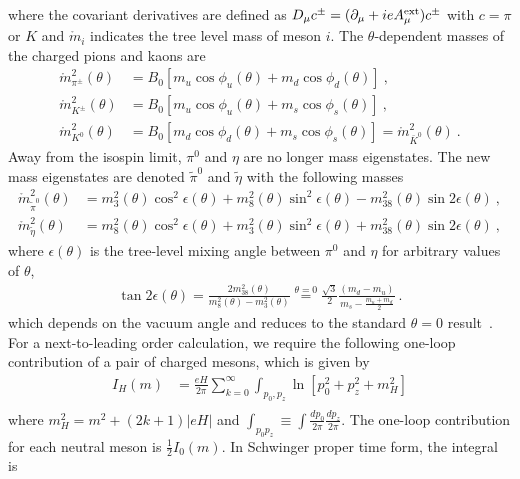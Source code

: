 \documentclass[12pt]{elsarticle}
\begin{document}
where the covariant derivatives are defined as $D_{\mu}c^{\pm}=(\partial_{\mu}+ieA^{\rm ext}_{\mu})c^{\pm}$ with $c=\pi$ or $K$ and $\mathring{m}_{i}$ indicates the tree level mass of meson $i$. The $\theta$-dependent masses of the charged pions and kaons are
\begin{align}
\label{eq:mp}
\mathring{m}_{\pi^{\pm}}^{2}(\theta)&=B_{0}[m_{u}\cos\phi_{u}(\theta)+m_{d}\cos\phi_{d}(\theta)]\ ,\\
\label{eq:mkc}
\mathring{m}_{K^{\pm}}^{2}(\theta)&=B_{0}[m_{u}\cos\phi_{u}(\theta)+m_{s}\cos\phi_{s}(\theta)]\ ,\\
\label{eq:mk0}
\mathring{m}_{K^{0}}^{2}(\theta)&=B_{0}[m_{d}\cos\phi_{d}(\theta)+m_{s}\cos\phi_{s}(\theta)]=\mathring{m}_{\bar{K}^{0}}^{2}(\theta)\ .
\end{align}
Away from the isospin limit, $\pi^{0}$ and $\eta$ are no longer mass eigenstates. The new mass eigenstates are denoted $\tilde{\pi}^{0}$ and $\tilde{\eta}$ with the following masses
\begin{align}
\label{eq:mp0t}
\mathring{m}_{\tilde{\pi}^{0}}^{2}(\theta)&=m_{3}^{2}(\theta)\cos^{2}\epsilon(\theta)+m_{8}^{2}(\theta)\sin^{2}\epsilon(\theta)-m_{38}^{2}(\theta)\sin2\epsilon(\theta)\ ,\\
\label{eq:metat}
\mathring{m}_{\tilde{\eta}}^{2}(\theta)&=m_{8}^{2}(\theta)\cos^{2}\epsilon(\theta)+m_{3}^{2}(\theta)\sin^{2}\epsilon(\theta)+m_{38}^{2}(\theta)\sin2\epsilon(\theta)\ ,
\end{align}
where $\epsilon(\theta)$ is the tree-level mixing angle between $\pi^{0}$ and $\eta$ for arbitrary values of $\theta$,
\begin{align}
\label{eq:epsilon}
\tan2\epsilon(\theta)=\frac{2m_{38}^{2}(\theta)}{m_{8}^{2}(\theta)-m_{3}^{2}(\theta)}\overset{\theta=0}{=}\frac{\sqrt{3}}{2}\frac{(m_{d}-m_{u})}{m_{s}-\tfrac{m_{u}+m_{d}}{2}}\ .
\end{align}
which depends on the vacuum angle and reduces to the standard $\theta=0$ result~\cite{Gasser:1984gg}. For a next-to-leading order calculation, we require the following one-loop contribution of a pair of charged mesons, which is given by 
\begin{equation}
\begin{split}
I_{H}(m)&=\frac{eH}{2\pi}\sum_{k=0}^{\infty}\int_{p_{0},p_{z}}\ln[p_{0}^{2}+p_{z}^{2}+m_{H}^{2}]\\
\end{split}
\end{equation}
where $m_{H}^{2}=m^{2}+(2k+1)|eH|$ and $\int_{p_{0}p_{z}}\equiv\int\frac{dp_{0}}{2\pi}\frac{dp_{z}}{2\pi}$. The one-loop contribution for each neutral meson is $\frac{1}{2}I_{0}(m)$. In Schwinger proper time form, the integral is
\end{document}
